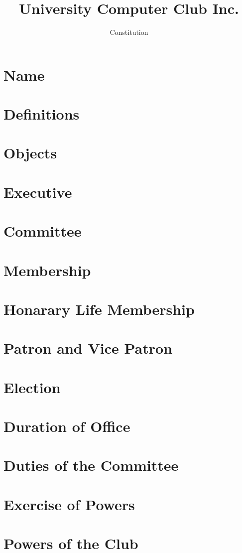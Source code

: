 \documentclass[12pt]{article} %
\title{University Computer Club Inc.}
\subtitle{Constitution}
\date{}
\author{}
\begin{document}
\maketitle
\tableofcontents

\section{Name}
\section{Definitions}
\section{Objects}
\section{Executive}
\section{Committee}
\section{Membership}
\section{Honarary Life Membership}
\section{Patron and Vice Patron}
\section{Election}
\section{Duration of Office}
\section{Duties of the Committee}
\section{Exercise of Powers}
\section{Powers of the Club}
\end{document}
